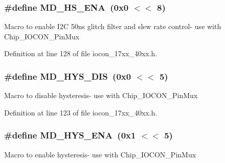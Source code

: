 \subsubsection[{\texorpdfstring{M\+D\+\_\+\+H\+S\+\_\+\+E\+NA}{MD_HS_ENA}}]{\setlength{\rightskip}{0pt plus 5cm}\#define M\+D\+\_\+\+H\+S\+\_\+\+E\+NA~(0x0 $<$$<$ 8)}\hypertarget{group__IOCON__17XX__40XX_ga95de7405f0be07e5a3c1eac75663b7e4}{}\label{group__IOCON__17XX__40XX_ga95de7405f0be07e5a3c1eac75663b7e4}
Macro to enable I2C 50ns glitch filter and slew rate control-\/ use with Chip\+\_\+\+I\+O\+C\+O\+N\+\_\+\+Pin\+Mux 

Definition at line 128 of file iocon\+\_\+17xx\+\_\+40xx.\+h.

\subsubsection[{\texorpdfstring{M\+D\+\_\+\+H\+Y\+S\+\_\+\+D\+IS}{MD_HYS_DIS}}]{\setlength{\rightskip}{0pt plus 5cm}\#define M\+D\+\_\+\+H\+Y\+S\+\_\+\+D\+IS~(0x0 $<$$<$ 5)}\hypertarget{group__IOCON__17XX__40XX_ga7c49147e8696b77ebf4bea2d90474a7f}{}\label{group__IOCON__17XX__40XX_ga7c49147e8696b77ebf4bea2d90474a7f}
Macro to disable hysteresis-\/ use with Chip\+\_\+\+I\+O\+C\+O\+N\+\_\+\+Pin\+Mux 

Definition at line 123 of file iocon\+\_\+17xx\+\_\+40xx.\+h.

\subsubsection[{\texorpdfstring{M\+D\+\_\+\+H\+Y\+S\+\_\+\+E\+NA}{MD_HYS_ENA}}]{\setlength{\rightskip}{0pt plus 5cm}\#define M\+D\+\_\+\+H\+Y\+S\+\_\+\+E\+NA~(0x1 $<$$<$ 5)}\hypertarget{group__IOCON__17XX__40XX_gab6a440afbad506dec9b0227f3c82fd73}{}\label{group__IOCON__17XX__40XX_gab6a440afbad506dec9b0227f3c82fd73}
Macro to enable hysteresis-\/ use with Chip\+\_\+\+I\+O\+C\+O\+N\+\_\+\+Pin\+Mux 


